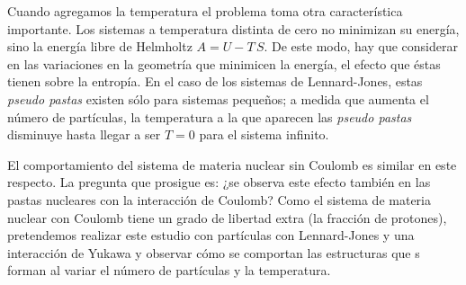 Cuando agregamos la temperatura el problema toma otra característica importante.
Los sistemas a temperatura distinta de cero no minimizan su energía, sino la energía libre de Helmholtz $A = U - T\,S$.
De este modo, hay que considerar en las variaciones en la geometría que minimicen la energía, el efecto que éstas tienen sobre la entropía.
En el caso de los sistemas de Lennard-Jones, estas \emph{pseudo pastas} existen sólo para sistemas pequeños; a medida que aumenta el número de partículas, la temperatura a la que aparecen las \emph{pseudo pastas} disminuye hasta llegar a ser $T=0$ para el sistema infinito.

El comportamiento del sistema de materia nuclear sin Coulomb es similar en este respecto.
La pregunta que prosigue es: ¿se observa este efecto también en las pastas nucleares con la interacción de Coulomb?
Como el sistema de materia nuclear con Coulomb tiene un grado de libertad extra (la fracción de protones), pretendemos realizar este estudio con partículas con Lennard-Jones y una interacción de Yukawa y observar cómo se comportan las estructuras que s forman al variar el número de partículas y la temperatura.